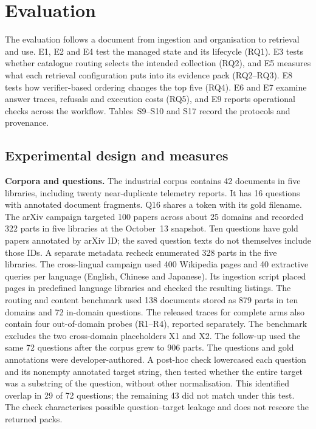\section{Evaluation}
\label{sec:eval}
The evaluation follows a document from ingestion and organisation to
retrieval and use. E1, E2 and E4 test the managed state and its lifecycle
(RQ1). E3 tests whether catalogue routing selects the intended collection
(RQ2), and E5 measures what each retrieval configuration puts into its
evidence pack (RQ2--RQ3). E8 tests how verifier-based ordering changes the
top five (RQ4). E6 and E7 examine answer traces, refusals and execution
costs (RQ5), and E9 reports operational checks across the workflow.
Tables~S9--S10 and S17 record the protocols and provenance.

\subsection{Experimental design and measures}
\label{sec:eval-setup}

\textbf{Corpora and questions.} The industrial corpus contains 42 documents
in five libraries, including twenty near-duplicate telemetry reports. It
has 16 questions with annotated document fragments. Q16 shares a token with
its gold filename. The arXiv campaign targeted 100 papers across about
25 domains and recorded 322 parts in five libraries at the October~13
snapshot. Ten questions have gold papers annotated by arXiv ID; the saved
question texts do not themselves include those IDs. A separate
metadata recheck enumerated 328 parts in the five libraries. The
cross-lingual campaign used 400 Wikipedia pages and 40 extractive queries per
language (English, Chinese and Japanese). Its ingestion script placed pages
in predefined language libraries and checked the resulting listings.
The routing and content benchmark used 138 documents stored as 879 parts in
ten domains and 72 in-domain questions. The released traces for complete
arms also contain four out-of-domain probes (R1--R4), reported separately.
The benchmark excludes the two cross-domain placeholders X1 and X2. The
follow-up used the same 72 questions after the corpus grew to 906 parts.
The questions and gold annotations were developer-authored. A post-hoc
check lowercased each question and its nonempty annotated target string,
then tested whether the entire target was a substring of the question,
without other normalisation. This identified overlap in 29 of 72 questions;
the remaining 43 did not match under this test. The check characterises
possible question--target leakage and does not rescore the returned packs.

